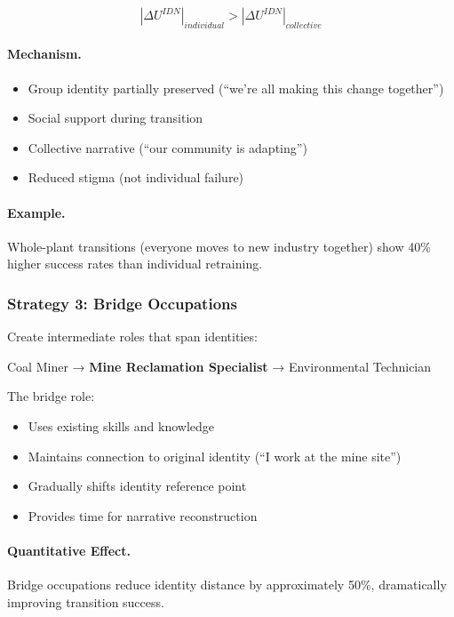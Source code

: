 \begin{equation}
|\Delta U^{IDN}|_{individual} > |\Delta U^{IDN}|_{collective}
\end{equation}

\paragraph{Mechanism.}
\begin{itemize}
    \item Group identity partially preserved (``we're all making this change together'')
    \item Social support during transition
    \item Collective narrative (``our community is adapting'')
    \item Reduced stigma (not individual failure)
\end{itemize}

\paragraph{Example.}
Whole-plant transitions (everyone moves to new industry together) show 
40\% higher success rates than individual retraining.

\subsubsection{Strategy 3: Bridge Occupations}

Create intermediate roles that span identities:

\begin{center}
Coal Miner → \textbf{Mine Reclamation Specialist} → Environmental Technician
\end{center}

The bridge role:
\begin{itemize}
    \item Uses existing skills and knowledge
    \item Maintains connection to original identity (``I work at the mine site'')
    \item Gradually shifts identity reference point
    \item Provides time for narrative reconstruction
\end{itemize}

\paragraph{Quantitative Effect.}
Bridge occupations reduce identity distance by approximately 50\%, 
dramatically improving transition success.

